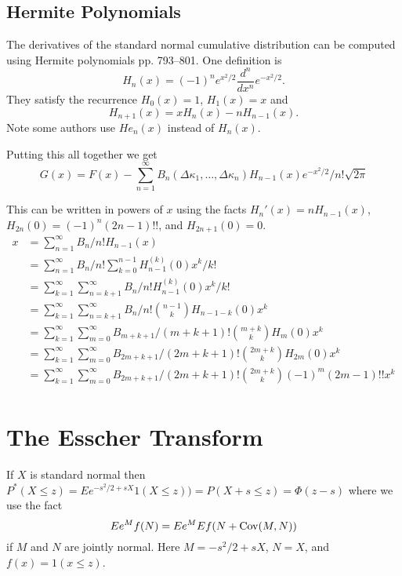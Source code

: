 \documentclass[11pt]{article}
\newcommand{\Cov}{\mathop{\rm{Cov}}}
\theoremstyle{definition}
\begin{document}
\subsection{Hermite Polynomials}
The derivatives of the standard normal cumulative distribution 
can be computed using Hermite polynomials\cite{AbrSte1964}
pp. 793--801.
One definition is
\[
H_n(x) = (-1)^n e^{x^2/2}\frac{d^n}{dx^n}e^{-x^2/2}.
\]
They satisfy the recurrence \(H_0(x) = 1\), \(H_1(x) = x\) and
\[
H_{n+1}(x) = xH_n(x) - n H_{n-1}(x).
\]
Note some authors use \(He_n(x)\) instead of \(H_n(x)\).

Putting this all together we get
\[
G(x) = F(x) - \sum_{n=1}^\infty
B_n(\Delta\kappa_1,\dots,\Delta\kappa_n) H_{n-1}(x)
e^{-x^2/2}/n!\sqrt{2\pi}
\]

This can be written in powers of \(x\) using
the facts \(H_n'(x) = nH_{n-1}(x)\),
\(H_{2n}(0) =(-1)^n(2n - 1)!!\), and \(H_{2n+1}(0) = 0\).
\begin{align*}
x &=\sum_{n=1}^\infty B_n/n! H_{n-1}(x) \\
&=\sum_{n=1}^\infty B_n/n! 
	\sum_{k=0}^{n-1}H_{n-1}^{(k)}(0) x^k/k!\\
&=\sum_{k=1}^\infty 
	\sum_{n=k+1}^\infty B_n/n! H_{n-1}^{(k)}(0) x^k/k!\\
&=\sum_{k=1}^\infty 
	\sum_{n=k+1}^\infty B_n/n! 
	{n-1 \choose k}  H_{n-1-k}(0)x^k\\
&=\sum_{k=1}^\infty 
	\sum_{m=0}^\infty B_{m+k+1}/(m+k+1)! {m + k \choose k}  H_m(0)x^k\\
&=\sum_{k=1}^\infty
	\sum_{m=0}^\infty B_{2m+k+1}/(2m+k+1)!
	{2m + k \choose k}  H_{2m}(0)x^k\\
&=\sum_{k=1}^\infty 
	\sum_{m=0}^\infty B_{2m+k+1}/(2m+k+1)!
	{2m + k \choose k}  (-1)^m(2m-1)!! x^k\\
\end{align*}


\section{The Esscher Transform}

If \(X\) is standard normal then
\(P^*(X\le z) = Ee^{-s^2/2 + sX} 1(X\le z)) = P(X + s\le z)
= \Phi(z - s)\)
where we use the fact
\[
Ee^M f(N) = Ee^M Ef(N + \Cov(M,N))
\]
if \(M\) and \(N\) are
jointly normal. Here \(M = -s^2/2 + sX\), \(N = X\), and \(f(x) = 1(x\le z)\).
\end{document}
